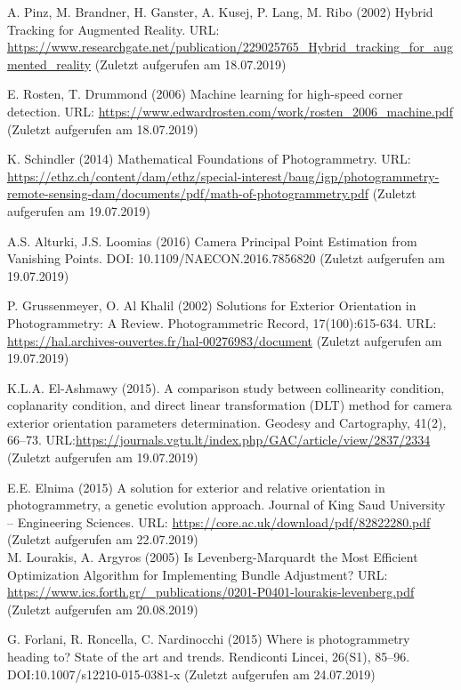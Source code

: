 \documentclass[12pt,oneside]{scrreprt}
\begin{document}
\begin{thebibliography}{10}
 A. Pinz, M. Brandner, H. Ganster, A. Kusej, P. Lang, M. Ribo (2002) Hybrid Tracking for Augmented Reality. URL: \url{https://www.researchgate.net/publication/229025765_Hybrid_tracking_for_augmented_reality} (Zuletzt aufgerufen am 18.07.2019)

 E. Rosten, T. Drummond (2006) Machine learning for high-speed corner detection. URL: \url{https://www.edwardrosten.com/work/rosten_2006_machine.pdf} (Zuletzt aufgerufen am 18.07.2019)

 K. Schindler (2014) Mathematical Foundations of
Photogrammetry. URL: \url{https://ethz.ch/content/dam/ethz/special-interest/baug/igp/photogrammetry-remote-sensing-dam/documents/pdf/math-of-photogrammetry.pdf} (Zuletzt aufgerufen am 19.07.2019)

 A.S. Alturki, J.S. Loomias (2016) Camera Principal Point Estimation from Vanishing Points. DOI: 10.1109/NAECON.2016.7856820 (Zuletzt aufgerufen am 19.07.2019)

 P. Grussenmeyer, O. Al Khalil (2002) Solutions for Exterior Orientation in Photogrammetry: A Review. Photogrammetric Record, 17(100):615-634. URL: \url{https://hal.archives-ouvertes.fr/hal-00276983/document} (Zuletzt aufgerufen am 19.07.2019)

 K.L.A. El-Ashmawy (2015). A comparison study between collinearity condition, coplanarity condition, and direct linear transformation (DLT) method for camera exterior orientation parameters determination. Geodesy and Cartography, 41(2), 66–73. URL:\url{https://journals.vgtu.lt/index.php/GAC/article/view/2837/2334} (Zuletzt aufgerufen am 19.07.2019)

 E.E. Elnima (2015) A solution for exterior and relative orientation
in photogrammetry, a genetic evolution approach. Journal of King Saud University – Engineering Sciences. URL: \url{https://core.ac.uk/download/pdf/82822280.pdf}  (Zuletzt aufgerufen am 22.07.2019) \\

 M. Lourakis, A. Argyros (2005) Is Levenberg-Marquardt the Most Efficient Optimization Algorithm for Implementing Bundle Adjustment? URL: \url{https://www.ics.forth.gr/_publications/0201-P0401-lourakis-levenberg.pdf} (Zuletzt aufgerufen am 20.08.2019) 

 G. Forlani, R. Roncella, C. Nardinocchi (2015) Where is photogrammetry heading to? State of the art and trends. Rendiconti Lincei, 26(S1), 85–96. DOI:10.1007/s12210-015-0381-x  (Zuletzt aufgerufen am 24.07.2019)


\end{thebibliography}
\end{document}

